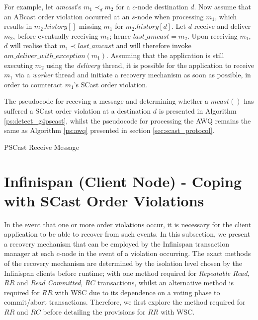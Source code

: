 For example, let \emph{amcast}'s $m_1 \prec_d m_2$ for a $c$-node destination $d$.  Now assume that an \textsf{ABcast} order violation occurred at an $s$-node when processing $m_1$, which results in $m_2.history[]$ missing $m_1$ for $m_2.history[d]$.  Let $d$ receive and deliver $m_2$, before eventually receiving $m_1$; hence $last\_amcast = m_2$.  Upon receiving $m_1$, $d$ will realise that $m_1 \prec last\_amcast$ and will therefore invoke $am\_deliver\_with\_exception(m_1)$.  Assuming that the application is still executing $m_2$ using the \emph{delivery} thread, it is possible for the application to receive $m_1$ via a \emph{worker} thread and initiate a recovery mechanism  as soon as possible, in order to counteract $m_1$'s \textsf{SCast} order violation.  

The pseudocode for receving a message and determining whether a $mcast()$ has suffered a \textsf{SCast} order violation at a destination $d$ is presented in Algorithm \ref{ps:detect_g4pscast}, whilst the pseudocode for processing the AWQ remains the same as Algorithm \ref{ps:awq} presented in section \ref{sec:scast_protocol}.  

    \begin{algorithm}[H]
       \caption{PSCast Receive Message}
        \label{ps:detect_g4pscast}
        \begin{algorithmic}[1]
		         \ENDIF
		     \ELSE
		     \ENDIF
        \end{algorithmic}
    \end{algorithm}   

\section{Infinispan (Client Node) - Coping with \textsf{SCast} Order Violations}
    In the event that one or more order violations occur, it is necessary for the client application to be able to recover from such events.  In this subsection, we present a recovery mechanism that can be employed by the Infinispan transaction manager at each $c$-node in the event of a violation occurring.  The exact methods of the recovery mechanism are determined by the isolation level chosen by the Infinispan clients before runtime; with one method required for \emph{Repeatable Read}, $RR$ and \emph{Read Committed}, $RC$ transactions, whilst an alternative method is required for $RR$ with WSC due to its dependence on a voting phase to commit/abort transactions.  Therefore, we first explore the method required for $RR$ and $RC$ before detailing the provisions for $RR$ with WSC.  
    

